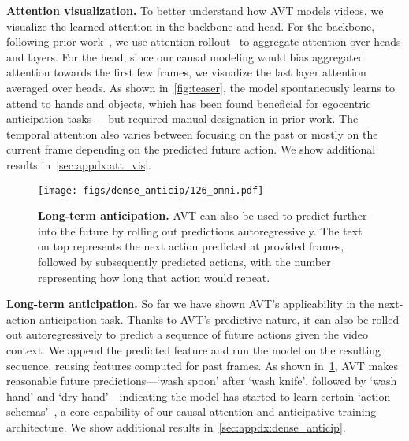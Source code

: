\documentclass[10pt,twocolumn,letterpaper]{article}
\newcommand{\method}{AVT\xspace}
\newcommand{\lossBoth}{anticipative\xspace}
\begin{document}
{\noindent \bf Attention visualization.}\label{sec:expt:qual:att}
To better understand how \method models videos, we visualize the learned attention in the backbone and head. For the backbone, following prior work~\cite{dosovitskiy2021image}, 
we use attention rollout~\cite{abnar2020quantifying} to 
aggregate attention over heads and layers. For the head, since our causal modeling would bias aggregated attention towards the first few frames, we visualize the last layer attention averaged over heads. As shown in~\cref{fig:teaser}, the model spontaneously learns to attend to hands and objects, which has been found beneficial for egocentric anticipation tasks~\cite{liu2020forecasting}---but required manual designation in prior work. The temporal attention also varies between focusing on the past or mostly on the current frame depending on the predicted future action. We show additional results in~\cref{sec:appdx:att_vis}.

\begin{figure}[t]
    \centering
\texttt{[image: figs/dense\_anticip/126\_omni.pdf]}
    \caption{{\bf Long-term anticipation.} \method can also be used to predict further into the future by rolling out predictions autoregressively. 
    The text on top represents the next action predicted at provided frames, 
    followed by subsequently predicted actions, with the number representing how long that action would repeat.
    }\label{fig:expt:dense}
\end{figure}
 
{\noindent \bf Long-term anticipation.}
So far we have shown \method's applicability in the next-action anticipation task. Thanks to \method's predictive nature, it can also be rolled out autoregressively to predict a sequence of future actions given the video context. We append the predicted feature and run the model on the resulting sequence, reusing features computed for past frames. As shown in~\cref{fig:expt:dense}, \method makes reasonable future predictions---`wash spoon' after `wash knife', followed by `wash hand' and `dry hand'---indicating the model has started to learn certain `action schemas'~\cite{piaget1935naissance}, a core capability of our causal attention and \lossBoth training architecture.  We show additional results in~\cref{sec:appdx:dense_anticip}.
\end{document}
